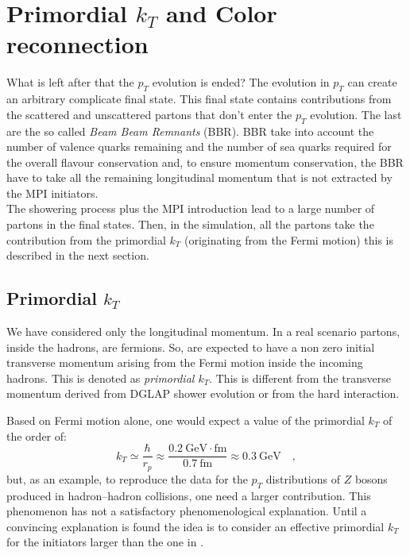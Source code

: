 \section{Primordial $k_T$ and Color reconnection}
\label{sec:Beam Beam Remnants and primordial kT}

What is left after that the $p_T$ evolution is ended?
The evolution in $p_T$ can create an arbitrary complicate final state. 
This final state contains contributions from the scattered and unscattered partons that don't enter the $p_T$ evolution. The last are the so called \textit{Beam Beam Remnants} (BBR). 
BBR take into account the number of valence quarks remaining and the number of sea quarks required for the overall flavour conservation and, to ensure momentum conservation, the BBR have to take all the remaining longitudinal momentum that is not extracted by the MPI initiators.
\\
The showering process plus the MPI introduction lead to a large number of partons in the final states. Then, in the simulation, all the partons take the contribution from the primordial $k_T$ (originating from the Fermi motion) this is described in the next section.    

\subsection*{Primordial $k_T$}

We have considered only the longitudinal momentum. In a real scenario partons, inside the hadrons, are fermions. So, are expected to have a non zero initial transverse momentum arising from the Fermi motion inside the incoming hadrons. This is denoted as \textit{primordial $k_T$}. This is different from the transverse momentum derived from DGLAP shower evolution or from the hard interaction.

\bigskip

\noindent Based on Fermi motion alone, one would expect a value of the primordial $k_T$ of the order of: 
\begin{equation}
	k_T\simeq\frac{\hbar}{r_p}\approx\frac{0.2\ \mathrm{GeV\cdot fm}}{0.7\ \mathrm{fm}}\approx0.3\ \mathrm{GeV}\quad,
\label{eq:PrimordialKT}
\end{equation}
but, as an example, to reproduce the data for the $p_T$ distributions of $Z$ bosons produced in hadron–hadron collisions, one need a larger contribution. This phenomenon has not a satisfactory phenomenological explanation. Until a convincing explanation is found the idea is to consider an effective primordial $k_T$ for the initiators larger than the one in .


